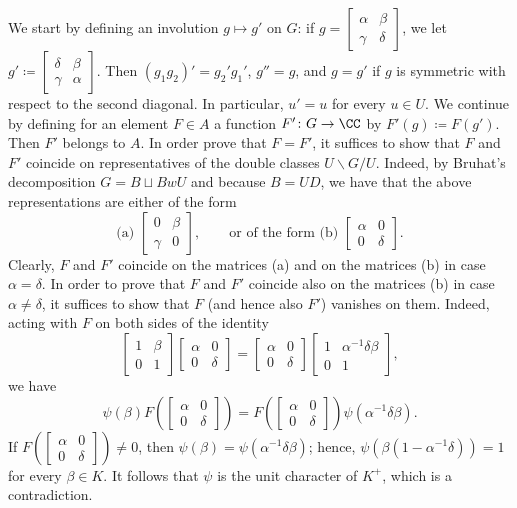 \documentclass[../main.tex]{subfiles}
\begin{document}
We start by defining an involution $g\mapsto g'$ on $G$: if $g=\begin{bmatrix}
	\alpha & \beta \\
	\gamma & \delta
\end{bmatrix}$, we let $g'\coloneqq\begin{bmatrix}
	\delta & \beta \\
	\gamma & \alpha
\end{bmatrix}$. Then $(g_1g_2)'=g_2'g_1'$, $g''=g$, and $g=g'$ if $g$ is symmetric with respect to the second diagonal. In particular, $u'=u$ for every $u\in U$. We continue by defining for an element $F\in A$ a function $F'\colon G\to\CC$ by $F'(g)\coloneqq F(g')$. Then $F'$ belongs to $A$. In order prove that $F=F'$, it suffices to show that $F$ and $F'$ coincide on representatives of the double classes $U\backslash G/U$. Indeed, by Bruhat's decomposition $G=B\sqcup BwU$ and because $B=UD$, we have that the above representations are either of the form
\[\text{(a) }\begin{bmatrix}
	0 & \beta \\
	\gamma & 0
\end{bmatrix},\qquad\text{or of the form (b) }\begin{bmatrix}
	\alpha & 0 \\
	0 & \delta
\end{bmatrix}.\]
Clearly, $F$ and $F'$ coincide on the matrices (a) and on the matrices (b) in case $\alpha=\delta$. In order to prove that $F$ and $F'$ coincide also on the matrices (b) in case $\alpha\ne\delta$, it suffices to show that $F$ (and hence also $F'$) vanishes on them. Indeed, acting with $F$ on both sides of the identity
\[\begin{bmatrix}
	1 & \beta \\
	0 & 1
\end{bmatrix}\begin{bmatrix}
	\alpha & 0 \\
	0 & \delta
\end{bmatrix}=\begin{bmatrix}
	\alpha & 0 \\
	0 & \delta
\end{bmatrix}\begin{bmatrix}
	1 & \alpha^{-1}\delta\beta \\
	0 & 1
\end{bmatrix},\]
we have
\[\psi(\beta)F\left(\begin{bmatrix}
	\alpha & 0 \\
	0 & \delta
\end{bmatrix}\right)=F\left(\begin{bmatrix}
	\alpha & 0 \\
	0 & \delta
\end{bmatrix}\right)\psi\left(\alpha^{-1}\delta\beta\right).\]
If $F\left(\begin{bmatrix}
	\alpha & 0 \\
	0 & \delta
\end{bmatrix}\right)\ne0$, then $\psi(\beta)=\psi\left(\alpha^{-1}\delta\beta\right)$; hence, $\psi\left(\beta\left(1-\alpha^{-1}\delta\right)\right)=1$ for every $\beta\in K$. It follows that $\psi$ is the unit character of $K^+$, which is a contradiction.
\end{document}
